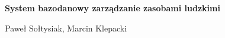 \documentclass[a4paper]{article}
\begin{document}
\textbf{System bazodanowy zarządzanie zasobami ludzkimi} 
    
Paweł Sołtysiak, Marcin Klepacki



\end{document}

